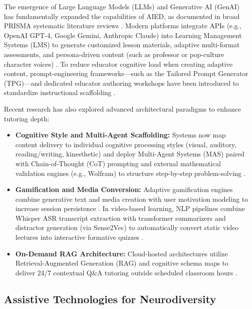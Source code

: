 The emergence of Large Language Models (LLMs) and Generative AI (GenAI) has fundamentally expanded the capabilities of AIED, as documented in broad PRISMA systematic literature reviews \cite{admane2024artificial, mittal2024comprehensive}. Modern platforms integrate APIs (e.g., OpenAI GPT-4, Google Gemini, Anthropic Claude) into Learning Management Systems (LMS) to generate customized lesson materials, adaptive multi-format assessments, and persona-driven content (such as professor or pop-culture character voices) \cite{binhammad2024investigating, pesovski2024generative, sarkar2025generative}. To reduce educator cognitive load when creating adaptive content, prompt-engineering frameworks—such as the Tailored Prompt Generator (TPG)—and dedicated educator authoring workshops have been introduced to standardize instructional scaffolding \cite{moraleschan2024aidriven, krouska2024chatgpt}. 

Recent research has also explored advanced architectural paradigms to enhance tutoring depth:
\begin{itemize}
    \item \textbf{Cognitive Style and Multi-Agent Scaffolding:} Systems now map content delivery to individual cognitive processing styles (visual, auditory, reading/writing, kinesthetic) \cite{singh2024investigating} and deploy Multi-Agent Systems (MAS) paired with Chain-of-Thought (CoT) prompting and external mathematical validation engines (e.g., Wolfram) to structure step-by-step problem-solving \cite{almetnawy2025adaptive}.
    \item \textbf{Gamification and Media Conversion:} Adaptive gamification engines combine generative text and media creation with user motivation modeling to increase session persistence \cite{abbes2024generative}. In video-based learning, NLP pipelines combine Whisper ASR transcript extraction with transformer summarizers and distractor generation (via Sense2Vec) to automatically convert static video lectures into interactive formative quizzes \cite{hamzaoui2024toward}.
    \item \textbf{On-Demand RAG Architecture:} Cloud-hosted architectures utilize Retrieval-Augmented Generation (RAG) and cognitive schema maps to deliver 24/7 contextual Q\&A tutoring outside scheduled classroom hours \cite{leon2024leveraging, sjcs2024generative}.
\end{itemize}

\subsection{Assistive Technologies for Neurodiversity}
\label{subsec:related_assistive}

